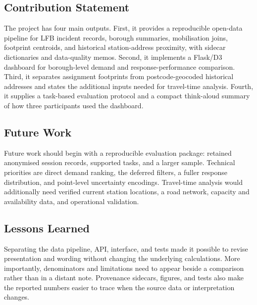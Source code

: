 \subsection{Contribution Statement}

The project has four main outputs. First, it provides a reproducible open-data pipeline for LFB incident records, borough summaries, mobilisation joins, footprint centroids, and historical station-address proximity, with sidecar dictionaries and data-quality memos. Second, it implements a Flask/D3 dashboard for borough-level demand and response-performance comparison. Third, it separates assignment footprints from postcode-geocoded historical addresses and states the additional inputs needed for travel-time analysis. Fourth, it supplies a task-based evaluation protocol and a compact think-aloud summary of how three participants used the dashboard.

\subsection{Future Work}

Future work should begin with a reproducible evaluation package: retained anonymised session records, supported tasks, and a larger sample. Technical priorities are direct demand ranking, the deferred filters, a fuller response distribution, and point-level uncertainty encodings. Travel-time analysis would additionally need verified current station locations, a road network, capacity and availability data, and operational validation.

\subsection{Lessons Learned}

Separating the data pipeline, API, interface, and tests made it possible to revise presentation and wording without changing the underlying calculations. More importantly, denominators and limitations need to appear beside a comparison rather than in a distant note. Provenance sidecars, figures, and tests also make the reported numbers easier to trace when the source data or interpretation changes.
